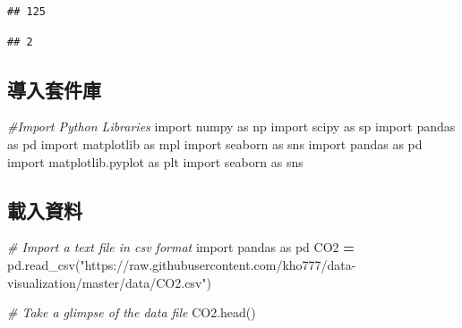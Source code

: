 \documentclass[]{book}
\newenvironment{Shaded}{\begin{snugshade}}{\end{snugshade}}
\newcommand{\CommentTok}[1]{\textcolor[rgb]{0.56,0.35,0.01}{\textit{#1}}}
\newcommand{\ImportTok}[1]{#1}
\newcommand{\NormalTok}[1]{#1}
\newcommand{\OperatorTok}[1]{\textcolor[rgb]{0.81,0.36,0.00}{\textbf{#1}}}
\newcommand{\StringTok}[1]{\textcolor[rgb]{0.31,0.60,0.02}{#1}}
\begin{document}
\begin{verbatim}
## 125
\end{verbatim}

\begin{Shaded}
\end{Shaded}

\begin{verbatim}
## 2
\end{verbatim}

\hypertarget{section-7}{%
\subsection{導入套件庫}\label{section-7}}

\begin{Shaded}
\begin{Highlighting}[]
\CommentTok{#Import Python Libraries}
\ImportTok{import}\NormalTok{ numpy }\ImportTok{as}\NormalTok{ np}
\ImportTok{import}\NormalTok{ scipy }\ImportTok{as}\NormalTok{ sp}
\ImportTok{import}\NormalTok{ pandas }\ImportTok{as}\NormalTok{ pd}
\ImportTok{import}\NormalTok{ matplotlib }\ImportTok{as}\NormalTok{ mpl}
\ImportTok{import}\NormalTok{ seaborn }\ImportTok{as}\NormalTok{ sns}
\ImportTok{import}\NormalTok{ pandas }\ImportTok{as}\NormalTok{ pd}
\ImportTok{import}\NormalTok{ matplotlib.pyplot }\ImportTok{as}\NormalTok{ plt}
\ImportTok{import}\NormalTok{ seaborn }\ImportTok{as}\NormalTok{ sns}
\end{Highlighting}
\end{Shaded}

\hypertarget{section-8}{%
\subsection{載入資料}\label{section-8}}

\begin{Shaded}
\begin{Highlighting}[]

\CommentTok{# Import a text file in csv format}
\ImportTok{import}\NormalTok{ pandas }\ImportTok{as}\NormalTok{ pd}
\NormalTok{CO2 }\OperatorTok{=}\NormalTok{ pd.read_csv(}\StringTok{"https://raw.githubusercontent.com/kho777/data-visualization/master/data/CO2.csv"}\NormalTok{)}

\CommentTok{# Take a glimpse of the data file}
\NormalTok{CO2.head()}
\end{Highlighting}
\end{Shaded}
\end{document}
